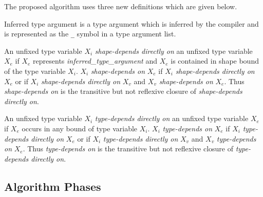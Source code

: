 The proposed algorithm uses three new definitions which are given below.
\begin{defn}
Inferred type argument is a type argument which is inferred by the compiler and is represented as the \texttt{\_} symbol in a type argument list.
\end{defn}
\begin{defn}
An unfixed type variable \texttt{$X_i$} \emph{shape-depends directly on} an unfixed type variable \texttt{$X_e$} if \texttt{$X_e$} represents \textit{inferred\_type\_argument} and \texttt{$X_e$} is contained in shape bound of the type variable \texttt{$X_i$}.
\texttt{$X_i$} \emph{shape-depends on} \texttt{$X_e$} if \texttt{$X_i$} \emph{shape-depends directly on} \texttt{$X_e$} or if \texttt{$X_i$} \emph{shape-depends directly on} \texttt{$X_v$} and \texttt{$X_v$} \emph{shape-depends on} \texttt{$X_e$}. Thus \emph{shape-depends on} is the transitive but not reflexive closure of \emph{shape-depends directly on}.
\end{defn}
\begin{defn}
An unfixed type variable \texttt{$X_i$} \emph{type-depends directly on} an unfixed type variable \texttt{$X_e$} if \texttt{$X_e$} occurs in any bound of type variable \texttt{$X_i$}.
\texttt{$X_i$} \emph{type-depends on} \texttt{$X_e$} if \texttt{$X_i$} \emph{type-depends directly on} \texttt{$X_e$} or if \texttt{$X_i$} \emph{type-depends directly on} \texttt{$X_v$} and \texttt{$X_v$} \emph{type-depends on} \texttt{$X_e$}. 
Thus \emph{type-depends on} is the transitive but not reflexive closure of \emph{type-depends directly on}.
\end{defn}

\subsection{Algorithm Phases}

